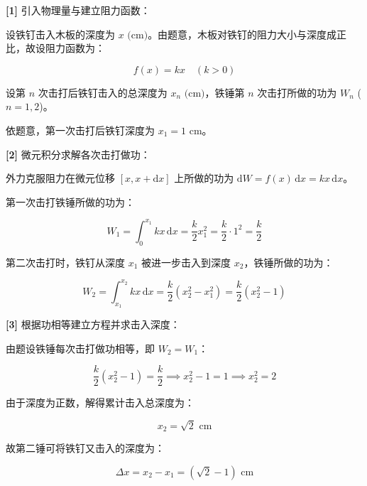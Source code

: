 \documentclass[11pt,a4paper,UTF8]{ctexart}
\begin{document}
\begin{solbox}[分步推导与答题规范]
\textbf{[1]} 引入物理量与建立阻力函数：

设铁钉击入木板的深度为 $x\text{ (cm)}$。由题意，木板对铁钉的阻力大小与深度成正比，故设阻力函数为：


\begin{equation*}
f(x) = kx \quad (k > 0)
\end{equation*}


设第 $n$ 次击打后铁钉击入的总深度为 $x_n\text{ (cm)}$，铁锤第 $n$ 次击打所做的功为 $W_n$ ($n = 1, 2$)。

依题意，第一次击打后铁钉深度为 $x_1 = 1\text{ cm}$。

\textbf{[2]} 微元积分求解各次击打做功：

外力克服阻力在微元位移 $[x, x + \mathrm{d}x]$ 上所做的功为 $\mathrm{d}W = f(x)\,\mathrm{d}x = kx\,\mathrm{d}x$。

第一次击打铁锤所做的功为：


\begin{equation*}
W_1 = \int_0^{x_1} kx\,\mathrm{d}x = \frac{k}{2}x_1^2 = \frac{k}{2} \cdot 1^2 = \frac{k}{2}
\end{equation*}


第二次击打时，铁钉从深度 $x_1$ 被进一步击入到深度 $x_2$，铁锤所做的功为：


\begin{equation*}
W_2 = \int_{x_1}^{x_2} kx\,\mathrm{d}x = \frac{k}{2}(x_2^2 - x_1^2) = \frac{k}{2}(x_2^2 - 1)
\end{equation*}


\textbf{[3]} 根据功相等建立方程并求击入深度：

由题设铁锤每次击打做功相等，即 $W_2 = W_1$：


\begin{equation*}
\frac{k}{2}(x_2^2 - 1) = \frac{k}{2} \implies x_2^2 - 1 = 1 \implies x_2^2 = 2
\end{equation*}


由于深度为正数，解得累计击入总深度为：


\begin{equation*}
x_2 = \sqrt{2}\text{ cm}
\end{equation*}


故第二锤可将铁钉又击入的深度为：


\begin{equation*}
\Delta x = x_2 - x_1 = (\sqrt{2} - 1)\text{ cm}
\end{equation*}

\end{solbox}
\end{document}
